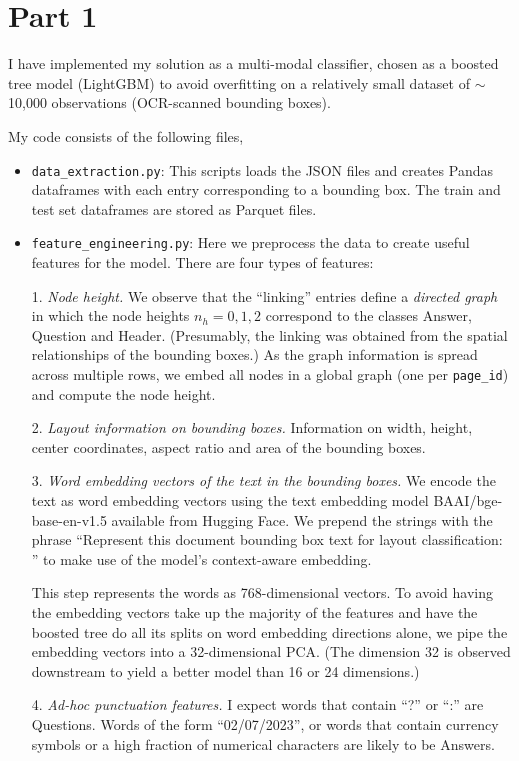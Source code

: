 \documentclass[11pt,a4paper]{article}
\numberwithin{equation}{section}
\begin{document}
\section{Part 1}

I have implemented my solution as a multi-modal classifier, 
chosen as a boosted tree model (LightGBM) to avoid overfitting 
on a relatively small dataset of $\sim$10,000 observations (OCR-scanned bounding boxes). 

My code consists of the following files,
\begin{itemize}
\item \texttt{data\_extraction.py}: This scripts loads the JSON files and creates 
Pandas dataframes with each entry corresponding to a bounding box. 
The train and test set dataframes are stored as Parquet files.

\item \texttt{feature\_engineering.py}: Here we preprocess the data to create 
useful features for the model. There are four types of features:

1. \emph{Node height.} We observe that the ``linking'' entries define 
a \emph{directed graph} in which the node heights $n_h=0,1,2$ correspond to 
the classes Answer, Question and Header. (Presumably, the linking was obtained from 
the spatial relationships of the bounding boxes.) As the graph information 
is spread across multiple rows, we embed all nodes in a global graph 
(one per \texttt{page\_id}) and compute the node height.

2. \emph{Layout information on bounding boxes.} Information on width, height, 
center coordinates, aspect ratio and area of the bounding boxes.

3. \emph{Word embedding vectors of the text in the bounding boxes.} 
We encode the text as word embedding vectors using the text embedding model
BAAI/bge-base-en-v1.5 available from Hugging Face. 
We prepend the strings with the phrase ``Represent this document bounding box text for layout classification: ''
to make use of the model's context-aware embedding.

This step represents the words as 768-dimensional vectors. To avoid having the embedding vectors 
take up the majority of the features and have the boosted tree do all its splits 
on word embedding directions alone, we pipe the embedding vectors 
into a 32-dimensional PCA. (The dimension 32 is observed downstream to yield 
a better model than 16 or 24 dimensions.)

4. \emph{Ad-hoc punctuation features.} I expect words that contain ``?'' 
or ``:'' are Questions. Words of the form ``02/07/2023'', or words that contain currency symbols 
or a high fraction of numerical characters are likely to be Answers.


\end{itemize}
\end{document}
